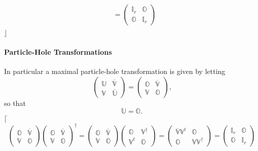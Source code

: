 \documentclass[aps, preprint]{revtex4}
\begin{document}
\begin{align}
 &  =\left (\begin{array}{cc}\mathbb{I}_{r} & \mathbb{O} \\
\mathbb{O} & \mathbb{I}_{r}\end{array}\right )\end{align}$\rfloor $ 

\paragraph{Particle-Hole Transformations}
In particular a maximal particle-hole transformation is given by letting
\begin{equation}\left (\begin{array}{cc}\mathbb{U} & \overline{\mathbb{V}} \\
\mathbb{V} & \overline{\mathbb{U}}\end{array}\right ) =\left (\begin{array}{cc}\mathbb{O} & \overline{\mathbb{V}} \\
\mathbb{V} & \mathbb{O}\end{array}\right )\text{,}
\end{equation}so that
\begin{equation}\mathbb{U} =\mathbb{O}\text{.}
\end{equation}$\lceil $
\begin{equation}\left (\begin{array}{cc}\mathbb{O} & \overline{\mathbb{V}} \\
\mathbb{V} & \mathbb{O}\end{array}\right ) \left (\begin{array}{cc}\mathbb{O} & \overline{\mathbb{V}} \\
\mathbb{V} & \mathbb{O}\end{array}\right )^{ \dag } =\left (\begin{array}{cc}\mathbb{O} & \overline{\mathbb{V}} \\
\mathbb{V} & \mathbb{O}\end{array}\right ) \left (\begin{array}{cc}\mathbb{O} & \mathbb{V}^{ \dag } \\
\mathbb{V}^{t} & \mathbb{O}\end{array}\right ) =\left (\begin{array}{cc}\overline{\mathbb{V}} \mathbb{V}^{t} & \mathbb{O} \\
\mathbb{O} & \mathbb{V} \mathbb{V}^{ \dag }\end{array}\right ) =\left (\begin{array}{cc}\mathbb{I}_{r} & \mathbb{O} \\
\mathbb{O} & \mathbb{I}_{r}\end{array}\right )
\end{equation}
\end{document}
